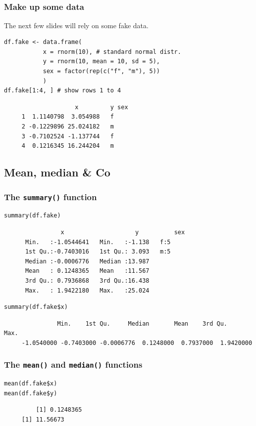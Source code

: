 \documentclass[bigger]{beamer}
\begin{document}
\subsection{}
\begin{frame}[fragile]
\frametitle{Make up some data}
\label{sec-5-1-1}

    The next few slides will rely on some fake data. 

\lstset{language=R}
\begin{lstlisting}
df.fake <- data.frame(
           x = rnorm(10), # standard normal distr.
           y = rnorm(10, mean = 10, sd = 5),
           sex = factor(rep(c("f", "m"), 5))
           )
df.fake[1:4, ] # show rows 1 to 4
\end{lstlisting}

\begin{verbatim}
                    x         y sex
     1  1.1140798  3.054988   f
     2 -0.1229896 25.024182   m
     3 -0.7102524 -1.137744   f
     4  0.1216345 16.244204   m
\end{verbatim}
\end{frame}
\subsection{Mean, median \& Co}
\label{sec-5-2}
\begin{frame}[fragile,shrink=5]
\frametitle{The \texttt{summary()} function}
\label{sec-5-2-1}


\lstset{language=R}
\begin{lstlisting}
summary(df.fake)
\end{lstlisting}

\begin{verbatim}
                x                    y          sex  
      Min.   :-1.0544641   Min.   :-1.138   f:5  
      1st Qu.:-0.7403016   1st Qu.: 3.093   m:5  
      Median :-0.0006776   Median :13.987        
      Mean   : 0.1248365   Mean   :11.567        
      3rd Qu.: 0.7936868   3rd Qu.:16.438        
      Max.   : 1.9422180   Max.   :25.024
\end{verbatim}


\lstset{language=R}
\begin{lstlisting}
summary(df.fake$x)
\end{lstlisting}

\begin{verbatim}
               Min.    1st Qu.     Median       Mean    3rd Qu.       Max. 
     -1.0540000 -0.7403000 -0.0006776  0.1248000  0.7937000  1.9420000
\end{verbatim}
\end{frame}
\begin{frame}[fragile]
\frametitle{The \texttt{mean()} and \texttt{median()} functions}
\label{sec-5-2-2}


\lstset{language=R}
\begin{lstlisting}
mean(df.fake$x)
mean(df.fake$y)
\end{lstlisting}

\begin{verbatim}
         [1] 0.1248365
     [1] 11.56673
\end{verbatim}
\end{frame}
\end{document}
